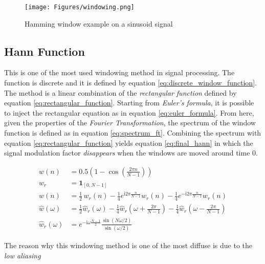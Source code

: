 \begin{figure}[!ht]
	\centering
	\texttt{[image: Figures/windowing.png]}
	\caption{Hamming window example on a sinusoid signal}
	\label{fig:windowing_ex}
\end{figure}


\subsection{Hann Function}
\label{ssubs:hann_function}
This is one of the most used windowing method in signal processing. The function is discrete and it is defined by equation \ref{eq:discrete_window_function}. The method is a linear combination of the \textit{rectangular function} defined by equation \ref{eq:rectangular_function}. Starting from \textit{Euler's formula}, it is possible to inject the rectangular equation as in equation \ref{eq:euler_formula}. From here, given the properties of the \textit{Fourier Transformation}, the spectrum of the window function is defined as in equation \ref{eq:spectrum_ft}. Combining the spectrum with equation \ref{eq:rectangular_function} yields equation \ref{eq:final_hann} in which the signal modulation factor \textit{disappears} when the windows are moved around time $0$.

\begin{subequations}
\label{eq:hann_function_equations}
\begin{align}
w(n) &= 0.5 \left(1 - \cos \left ( \frac{2 \pi n}{N-1} \right) \right) \label{eq:discrete_window_function} \\
w_r &= \mathbf{1}_{[0,N-1]} \label{eq:rectangular_function} \\
w(n) &= \frac{1}{2} \,w_r(n) -\frac{1}{4} e^{\mathrm{i}2\pi \frac{n}{N-1}} w_r(n) - \frac{1}{4}e^{-\mathrm{i}2\pi \frac{n}{N-1}} w_r(n) \label{eq:euler_formula} \\
\hat{w} (\omega) &= \frac{1}{2} \hat{w}_r (\omega) - \frac{1}{4} \hat{w}_r \left(\omega + \frac{2\pi}{N-1}\right) - \frac{1}{4} \hat{w}_r \left(\omega - \frac{2\pi}{N-1}\right) \label{eq:spectrum_ft} \\
\hat{w}_r (\omega) &= e^{-\mathrm{i} \omega \frac{N-1}{2}} \frac{\sin(N\omega/2)}{\sin(\omega/2)} \label{eq:final_hann}
\end{align}
\end{subequations}

\noindent The reason why this windowing method is one of the most diffuse is due to the \textit{low aliasing}


